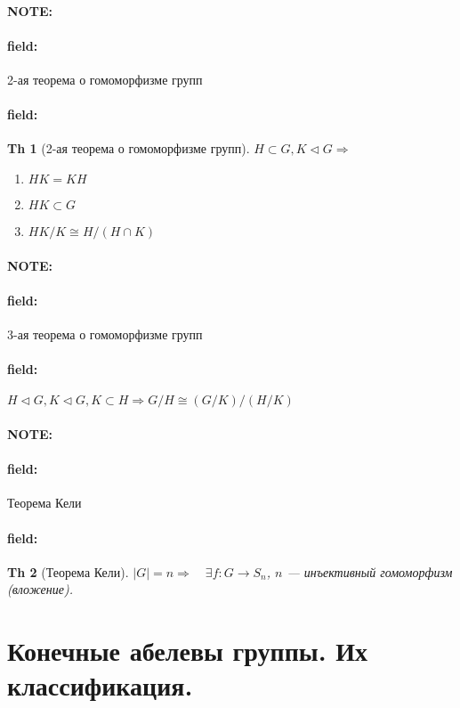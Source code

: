 \documentclass[12pt]{article}
\newenvironment{note}{\paragraph{NOTE:}}{}
\newenvironment{field}{\paragraph{field:}}{}
\newtheorem{theorem}{Th}
\begin{document}
\begin{note}
  \begin{field}
    2-ая теорема о гомоморфизме групп
  \end{field}
  \begin{field}
    \begin{theorem}[2-ая теорема о гомоморфизме групп]
      $H \subset G, K \vartriangleleft G \Rightarrow$
      \begin{enumerate}
        \item
              $HK = KH$
        \item
              $HK \subset G$
        \item
              $HK/K \cong H/(H \cap K)$
      \end{enumerate}
    \end{theorem}
  \end{field}
\end{note}

\begin{note}
  \begin{field}
    3-ая теорема о гомоморфизме групп
  \end{field}
  \begin{field}
    $H \vartriangleleft G, K \vartriangleleft G, K \subset H \Rightarrow G/H \cong (G/K)/(H/K)$
  \end{field}
\end{note}

\begin{note}
  \begin{field}
    Теорема Кели
  \end{field}
  \begin{field}
    \begin{theorem}[Теорема Кели]
      $|G| = n \Rightarrow \quad{} \exists f : G \rightarrow S_{n}$, $n$ --- инъективный гомоморфизм (вложение).
    \end{theorem}
  \end{field}
\end{note}

\section{Конечные абелевы группы. Их классификация.}
\end{document}
